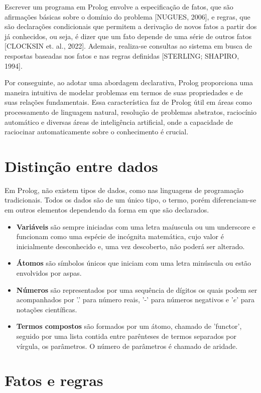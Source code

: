 \documentclass[12pt]{article}
\begin{document}
Escrever um programa em Prolog envolve a especificação de fatos, que são afirmações básicas sobre o domínio do problema [NUGUES, 2006], e regras, que são declarações condicionais que permitem a derivação de novos fatos a partir dos já conhecidos, ou seja, é dizer que um fato depende de uma série de outros fatos [CLOCKSIN et. al., 2022]. Ademais, realiza-se consultas ao sistema em busca de respostas baseadas nos fatos e nas regras definidas [STERLING; SHAPIRO, 1994]. 

Por conseguinte, ao adotar uma abordagem declarativa, Prolog proporciona uma maneira intuitiva de modelar problemas em termos de suas propriedades e de suas relações fundamentais. Essa característica faz de Prolog útil em áreas como processamento de linguagem natural, resolução de problemas abstratos, raciocínio automático e diversas áreas de inteligência artificial,  onde a capacidade de raciocinar automaticamente sobre o conhecimento é crucial.

\section{Distinção entre dados}
Em Prolog, não existem tipos de dados, como nas linguagens de programação tradicionais. Todos os dados são de um único tipo, o termo, porém diferenciam-se em outros elementos dependendo da forma em que são declarados.

\begin{itemize}
  \item \textbf{Variáveis} são sempre iniciadas com uma letra maíuscula ou um underscore e funcionam como uma espécie de incógnita matemática, cujo valor é inicialmente desconhecido e, uma vez descoberto, não poderá ser alterado.
  \item \textbf{Átomos} são símbolos únicos que iniciam com uma letra minúscula ou estão envolvidos por aspas.
  \item \textbf{Números} são representados por uma sequência de dígitos os quais podem ser acompanhados por '.' para número reais, '-' para números negativos e '$e$' para notações científicas.
  \item \textbf{Termos compostos} são formados por um átomo, chamado de 'functor', seguido por uma lista contida entre parênteses de termos separados por vírgula, os parâmetros. O número de parâmetros é chamado de aridade.
\end{itemize}

\section{Fatos e regras}
\end{document}
